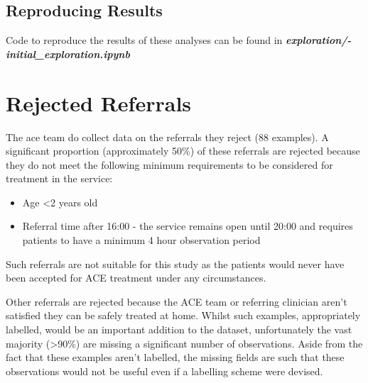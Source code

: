 \subsection{Reproducing Results}\label{subsec:reproducing-results2}
Code to reproduce the results of these analyses can be found in \textbf{\textit{exploration/\newline-initial\_exploration.ipynb}}

\section{Rejected Referrals}\label{sec:rejected-referrals}
The ace team do collect data on the referrals they reject (88 examples). A significant proportion (approximately 50\%) of these referrals are rejected because they do not meet the following minimum requirements to be considered for treatment in the service:

\begin{itemize}
    \item Age \textless2 years old
    \item Referral time after 16:00 - the service remains open until 20:00 and requires patients to have a minimum 4 hour observation period
\end{itemize}
Such referrals are not suitable for this study as the patients would never have been accepted for ACE treatment under any circumstances.

Other referrals are rejected because the ACE team or referring clinician aren't satisfied they can be safely treated at home. Whilst such examples, appropriately labelled, would be an important addition to the dataset, unfortunately the vast majority (\textgreater 90\%) are missing a significant number of observations. Aside from the fact that these examples aren't labelled, the missing fields are such that these observations would not be useful even if a labelling scheme were devised.